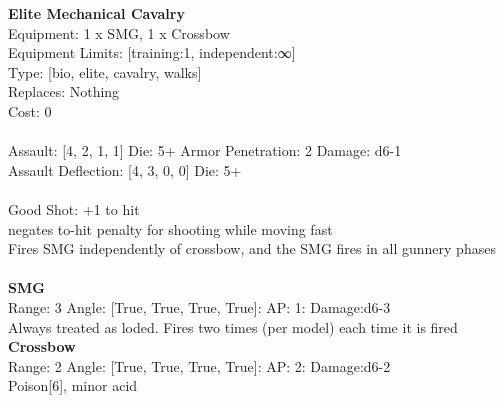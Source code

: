\noindent 

{\bf Elite Mechanical Cavalry } \\
Equipment: 1 x SMG, 1 x Crossbow \\
Equipment Limits: [training:1, independent:∞] \\
Type: [bio, elite, cavalry, walks] \\
Replaces: Nothing \\
Cost: 0\\
\ \\
Assault: [4, 2, 1, 1] Die: 5+ Armor Penetration: 2 Damage: d6-1 \\
Assault Deflection: [4, 3, 0, 0] Die: 5+\\
\indent  
\ \\
Good Shot: +1 to hit\\ 
negates to-hit penalty for shooting while moving fast\\ 
Fires SMG independently of crossbow, and the SMG fires in all gunnery phases\\ 

\ \\
{\bf SMG } \\



Range: 3  Angle: [True, True, True, True]: AP: 1: Damage:d6-3 \\
Always treated as loded. Fires two times (per model) each time it is fired\\ 




{\bf Crossbow } \\



Range: 2  Angle: [True, True, True, True]: AP: 2: Damage:d6-2 \\
Poison[6], minor acid\\ 




 
\ \\



